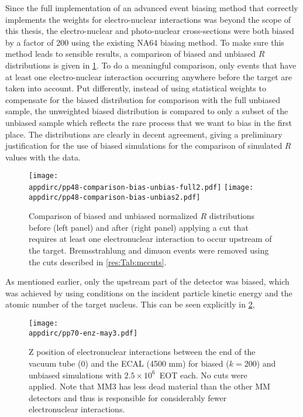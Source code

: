 Since the full implementation of an advanced event biasing method that correctly implements the weights for electro-nuclear interactions was beyond the scope of this thesis, the electro-nuclear and photo-nuclear cross-sections were both biased by a factor of 200 using the existing NA64 biasing method. To make sure this method leads to sensible results, a comparison of biased and unbiased $R$ distributions is given in \ref{res:fig:biascomp}. To do a meaningful comparison, only events that have at least one electro-nuclear interaction occurring anywhere before the target are taken into account. Put differently, instead of using statistical weights to compensate for the biased distribution for comparison with the full unbiased sample, the unweighted biased distribution is compared to only a subset of the unbiased sample which reflects the rare process that we want to bias in the first place. The distributions are clearly in decent agreement, giving a preliminary justification for the use of biased simulations for the comparison of simulated $R$ values with the data.
%
\begin{figure}[htb]
    \centering
    \texttt{[image: \\appdirc/pp48-comparison-bias-unbias-full2.pdf]}
    \texttt{[image: \\appdirc/pp48-comparison-bias-unbias2.pdf]}
    \caption[Comparison of biased and unbiased $R$ distributions.]{Comparison of biased and unbiased normalized $R$ distributions before (left panel) and after (right panel) applying a cut that requires at least one electronuclear interaction to occur upstream of the target. Bremsstrahlung and dimuon events were removed using the cuts described in \ref{res:Tab:mccuts}.}
  \label{res:fig:biascomp}
\end{figure}

As mentioned earlier, only the upstream part of the detector was biased, which was achieved by using conditions on the incident particle kinetic energy and the atomic number of the target nucleus. This can be seen explicitly in \ref{res:fig:enz},
%
\begin{figure}[htb]
  \centering
  \texttt{[image: \\appdirc/pp70-enz-may3.pdf]}
  \caption[Histograms of the z position of electronuclear interactions.]{Z position of electronuclear interactions between the end of the vacuum tube (0) and the ECAL (4500 mm) for biased ($k=200$) and unbiased simulations with $2.5\times10^6$~EOT each. No cuts were applied. Note that MM3 has less dead material than the other MM detectors and thus is responsible for considerably fewer electronuclear interactions.}
  \label{res:fig:enz}
\end{figure}

